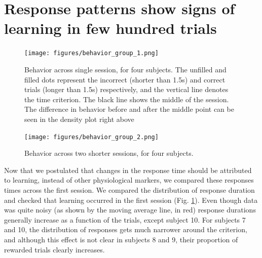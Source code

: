 \section{Response patterns show signs of learning in few hundred trials}
    \begin{figure}
        \centering
        \texttt{[image: figures/behavior\_group\_1.png]}
        \caption[Behavior across single session]{Behavior across single session, for four subjects. The unfilled and filled dots represent the incorrect (shorter than 1.5s) and correct trials (longer than 1.5s) respectively, and the vertical line denotes the time criterion. The black line shows the middle of the session. The difference in behavior before and after the middle point can be seen in the density plot right above}
        \label{fig:behavior}
    \end{figure} 
    
    \begin{figure}
        \centering
        \texttt{[image: figures/behavior\_group\_2.png]}
        \caption[Behavior across two sessions]{Behavior across two shorter sessions, for four subjects.}
        \label{fig:behavior2}
    \end{figure} 


Now that we postulated that changes in the response time should be attributed to learning, instead of other physiological markers, we compared these responses times across the first session. We compared the distribution of response duration and checked that learning occurred in the first session (Fig. \ref{fig:behavior}). Even though data was quite noisy (as shown by the moving average line, in red) response durations generally increase as a function of the trials, except subject 10. For subjects 7 and 10, the distribution of responses gets much narrower around the criterion, and although this effect is not clear in subjects 8 and 9, their proportion of rewarded trials clearly increases. %
